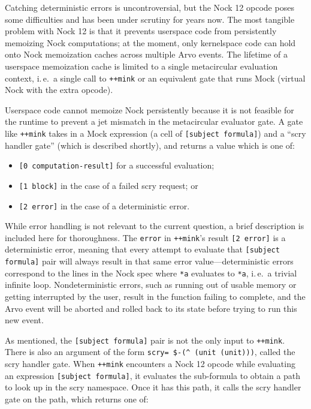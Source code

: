 \documentclass[twoside]{article}
\begin{document}
Catching deterministic errors is uncontroversial, but the Nock 12 opcode poses some difficulties and has been under scrutiny for years now.  The most tangible problem with Nock 12 is that it prevents userspace code from persistently memoizing Nock computations; at the moment, only kernelspace code can hold onto Nock memoization caches across multiple Arvo events.  The lifetime of a userspace memoization cache is limited to a single metacircular evaluation context, i.\,e.\ a single call to \lstinline[style=inlinecode]{++mink} or an equivalent gate that runs Mock (virtual Nock with the extra opcode).

Userspace code cannot memoize Nock persistently because it is not feasible for the runtime to prevent a jet mismatch in the metacircular evaluator gate.  A gate like \lstinline[style=inlinecode]{++mink} takes in a Mock expression (a cell of \lstinline[style=inlinecode]{[subject formula]}) and a “scry handler gate” (which is described shortly), and returns a value which is one of:

\begin{itemize}
  \item  \lstinline[style=inlinecode]{[0 computation-result]} for a successful evaluation;
  \item  \lstinline[style=inlinecode]{[1 block]} in the case of a failed scry request; or
  \item  \lstinline[style=inlinecode]{[2 error]} in the case of a deterministic error.
\end{itemize}

\noindent
While error handling is not relevant to the current question, a brief description is included here for thoroughness.  The \lstinline[style=inlinecode]{error} in \lstinline[style=inlinecode]{++mink}'s result \lstinline[style=inlinecode]{[2 error]} is a deterministic error, meaning that every attempt to evaluate that \lstinline[style=inlinecode]{[subject formula]} pair will always result in that same error value—deterministic errors correspond to the lines in the Nock spec where \lstinline[style=inlinecode]{*a} evaluates to \lstinline[style=inlinecode]{*a}, i.\,e.\ a trivial infinite loop.  Nondeterministic errors, such as running out of usable memory or getting interrupted by the user, result in the function failing to complete, and the Arvo event will be aborted and rolled back to its state before trying to run this new event.

As mentioned, the \lstinline[style=inlinecode]{[subject formula]} pair is not the only input to \lstinline[style=inlinecode]{++mink}.  There is also an argument of the form \lstinline[style=inlinecode]{scry= $-(^ (unit (unit)))}, called the scry handler gate.  When \lstinline[style=inlinecode]{++mink} encounters a Nock 12 opcode while evaluating an expression \lstinline[style=inlinecode]{[subject formula]}, it evaluates the sub-formula to obtain a path to look up in the scry namespace.  Once it has this path, it calls the scry handler gate on the path, which returns one of:
\end{document}
